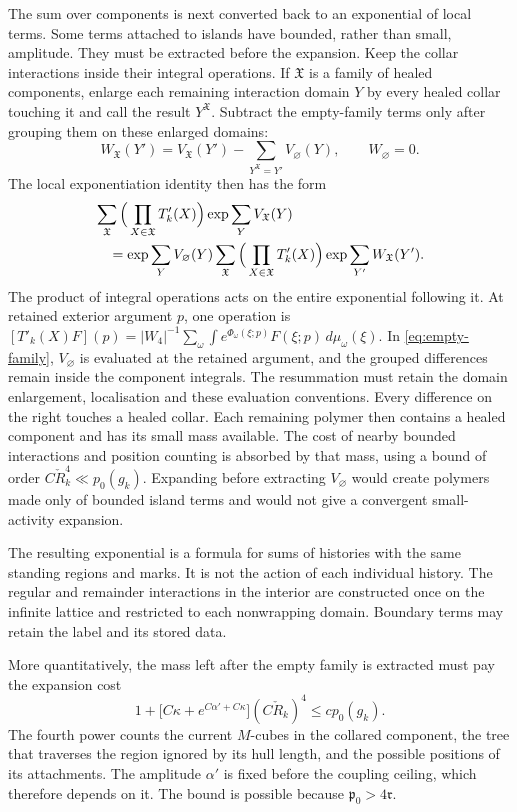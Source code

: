 \documentclass[11pt,letterpaper,reqno]{amsart}
\theoremstyle{definition}
\theoremstyle{remark}
\begin{document}
The sum over components is next converted back to an exponential
of local terms. Some terms attached to islands have bounded, rather
than small, amplitude. They must be extracted before the expansion.
Keep the collar interactions inside their integral operations.
If $\mathfrak X$ is a family of healed components, enlarge each
remaining interaction domain $Y$ by every healed collar touching it and call
the result $Y^{\mathfrak X}$. Subtract the empty-family terms only
after grouping them on these enlarged domains:
\[
 W_{\mathfrak X}(Y')=
 V_{\mathfrak X}(Y')-
       \sum_{Y^{\mathfrak X}=Y'}V_\varnothing(Y),
 \qquad W_\varnothing=0.
\]
The local exponentiation identity then has the form
\begin{align}\label{eq:empty-family}
 &\sum_\mathfrak X\Big(\prod_{X\in\mathfrak X}T'_k(X)\Big)
                           \exp\sum_YV_{\mathfrak X}(Y)
 \notag\\
 &\quad=\exp\sum_YV_\varnothing(Y)
   \sum_\mathfrak X\Big(\prod_{X\in\mathfrak X}T'_k(X)\Big)
                   \exp\sum_{Y'}W_{\mathfrak X}(Y').
\end{align}
The product of integral operations acts on the entire exponential
following it. At retained exterior argument $p$, one operation is
$[T'_k(X)F](p)=|W_4|^{-1}\sum_\omega
\int e^{\Phi_\omega(\xi;p)}F(\xi;p)\,d\mu_\omega(\xi)$.
In \eqref{eq:empty-family}, $V_\varnothing$ is evaluated at the retained
argument, and the grouped differences remain inside the component
integrals. The resummation must retain the domain enlargement,
localisation and these evaluation conventions.
Every difference on the right touches a healed collar. Each remaining polymer
then contains a healed component and has its small mass available.
The cost of nearby bounded interactions and position counting is
absorbed by that mass, using a bound of order
$C\check R_k^4\ll p_0(g_k)$. Expanding before extracting
$V_\varnothing$ would create polymers made only of bounded island
terms and would not give a convergent small-activity expansion.

The resulting exponential is a formula for sums of histories with
the same standing regions and marks. It is not the action of each
individual history. The regular and remainder interactions in the
interior are constructed once on the infinite lattice and restricted
to each nonwrapping domain. Boundary terms may retain the label and
its stored data.

More quantitatively, the mass left
after the empty family is extracted
must pay the expansion cost
\begin{equation}\label{eq:xrg-exponentiation-budget}
 1+\big[C\kappa+e^{C\alpha'+C\kappa}\big]
                        (C\check R_k)^4\le cp_0(g_k).
\end{equation}
The fourth power counts the current
$M$-cubes in the collared component,
the tree that traverses the region
ignored by its hull length, and the
possible positions of its attachments.
The amplitude $\alpha'$ is fixed
before the coupling ceiling, which
therefore depends on it. The bound
is possible because
$\mathfrak p_0>4\mathfrak r$.
\end{document}
